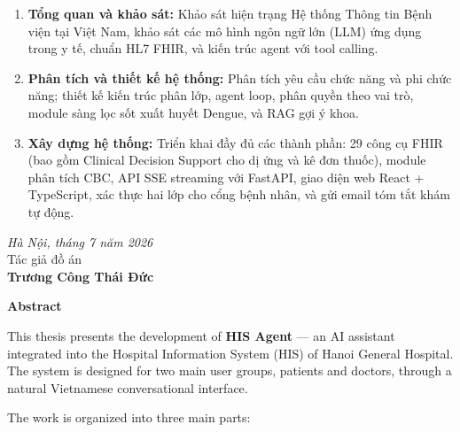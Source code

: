 \documentclass[a4paper,13pt,3p,oneside]{report}
\theoremstyle{definition}
\theoremstyle{remark}
\theoremstyle{definition}
\begin{document}
\begin{enumerate}
\item \textbf{Tổng quan và khảo sát:} Khảo sát hiện trạng Hệ thống Thông tin Bệnh viện tại Việt Nam, khảo sát các mô hình ngôn ngữ lớn (LLM) ứng dụng trong y tế, chuẩn HL7 FHIR, và kiến trúc agent với tool calling.

\item \textbf{Phân tích và thiết kế hệ thống:} Phân tích yêu cầu chức năng và phi chức năng; thiết kế kiến trúc phân lớp, agent loop, phân quyền theo vai trò, module sàng lọc sốt xuất huyết Dengue, và RAG gợi ý khoa.

\item \textbf{Xây dựng hệ thống:} Triển khai đầy đủ các thành phần: 29 công cụ FHIR (bao gồm Clinical Decision Support cho dị ứng và kê đơn thuốc), module phân tích CBC, API SSE streaming với FastAPI, giao diện web React + TypeScript, xác thực hai lớp cho cổng bệnh nhân, và gửi email tóm tắt khám tự động.
\end{enumerate}

\hspace{0.5\textwidth}
\begin{minipage}{0.5\textwidth}
	\noindent\begin{center}
		\vspace{1cm}
		\textit{Hà Nội, tháng 7 năm 2026} \\
		Tác giả đồ án\\ \vspace{2cm}
		\textbf{Trương Công Thái Đức}
	\end{center}
\end{minipage}

\newpage
{}
\fontsize{22pt}{16pt}\selectfont
{\bfseries Abstract}
\fontsize{13pt}{16pt}\selectfont
\bigskip
\bigskip

This thesis presents the development of \textbf{HIS Agent} --- an AI assistant integrated into the Hospital Information System (HIS) of Hanoi General Hospital. The system is designed for two main user groups, patients and doctors, through a natural Vietnamese conversational interface.

The work is organized into three main parts:
\end{document}
